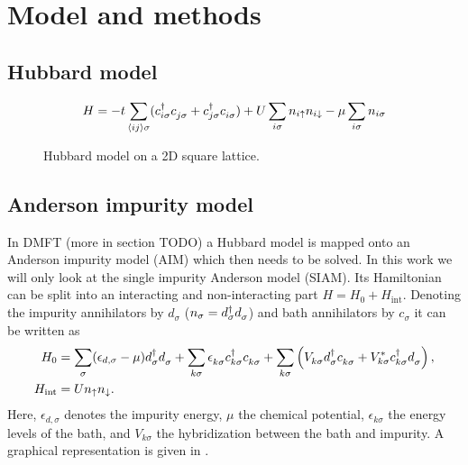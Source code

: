 
\chapter{Model and methods}

\section{Hubbard model}

\begin{equation}
    H
    =
    -t\sum_{\langle i j\rangle\sigma}
    (c^\dag_{i\sigma} c^{\pdag}_{j\sigma} + c^\dag_{j\sigma} c^{\pdag}_{i\sigma})
    +
    U\sum_{i\sigma} n_{i\uparrow} n_{i\downarrow}
    -
    \mu\sum_{i\sigma} n_{i\sigma}
\end{equation}

\begin{figure}[ht]
    \centering
    
    \caption{
        Hubbard model on a 2D square lattice.
    }
    \label{fig:hubbard-model}
\end{figure}

\section{Anderson impurity model}

In DMFT (more in section TODO) a Hubbard model is mapped onto an Anderson impurity model (AIM)
which then needs to be solved.
In this work we will only look at the single impurity Anderson model (SIAM).
Its Hamiltonian can be split into an interacting and non-interacting part
$H = H_0 + H_\mathrm{int}$.
Denoting the impurity annihilators by $d_\sigma$ ($n_\sigma = d^\dag_\sigma d^{\pdag}_\sigma$)
and bath annihilators by $c_\sigma$
it can be written as
\begin{align}
    H_0
     & =
    \sum_{\pk\sigma} (\epsilon_{d,\sigma} - \mu) d^\dag_{\pk\sigma} d^{\pdag}_{\pk\sigma}
    +
    \sum_{k\sigma} \epsilon_{k\sigma}^{\pdag} c^\dag_{k\sigma} c^{\pdag}_{k\sigma}
    +
    \sum_{k\sigma} \left(V^{\ps}_{k\sigma} d^\dag_{\vphantom{k}\sigma} c^{\pdag}_{k\sigma}
    + V_{k\sigma}^* c^\dag_{k\sigma} d^{\pdag}_{\vphantom{k}\sigma} \right),
    \\
    H_\mathrm{int}
     & =
    U n_\uparrow n_\downarrow.
\end{align}
Here,
$\epsilon_{d,\sigma}$ denotes the impurity energy,
$\mu$ the chemical potential,
$\epsilon_{k\sigma}$ the energy levels of the bath,
and $V_{k\sigma}$ the hybridization between the bath and impurity.
A graphical representation is given in .

